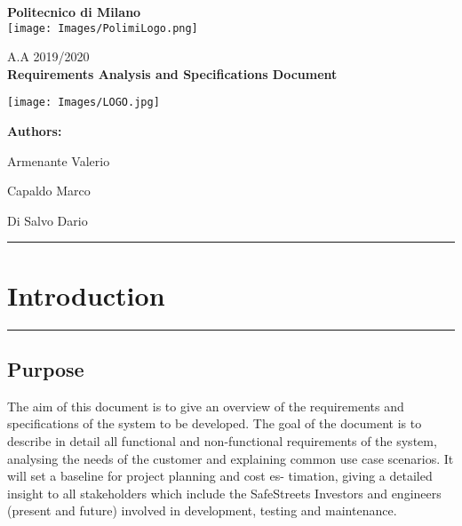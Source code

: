 \documentclass[12pt]{article}
\begin{document}
\onehalfspacing
\begin{center}
	{\huge {\textbf{Politecnico di Milano}}}
	 	\vspace{7mm}\\
	 	
 	 	\texttt{[image: Images/PolimiLogo.png]}
	\end{center}

\begin{center}
	     \vspace{5mm}
		{\Large A.A 2019/2020} 
		\vspace{5mm}\\
		{\Large {\textbf{Requirements Analysis and Specifications Document}}}  
		
		 \texttt{[image: Images/LOGO.jpg]}
    \end{center}
          
\begin{flushright}
         
	 	 
	 	{\huge {\Large \textbf{Authors:}}}
	 	 
	 	{Armenante Valerio}
	 	 
	 	{Capaldo Marco}
	 	 
	 	{Di Salvo Dario}
	\end{flushright}



\newpage
\hrule
\tableofcontents %

\vspace{0.5mm}
\vspace{0.24mm}

\newpage

\section{Introduction} %
\hrule
\vspace{8mm}
\subsection{Purpose} %
\vspace{5mm}
       The aim of this document is to give an overview of the             requirements and specifications of the system to be developed. The goal of the document is to describe in detail all functional and non-functional requirements of the system, analysing the needs of the customer and explaining common use case scenarios. It will set a baseline for project planning and cost es- timation, giving a detailed insight to all stakeholders which include the SafeStreets Investors and engineers (present and future) involved in development, testing and maintenance. 
\end{document}
